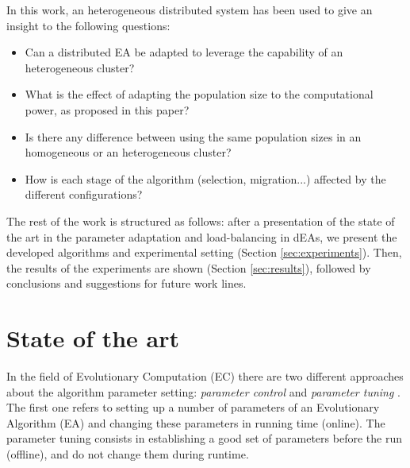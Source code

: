 \documentclass[final,1p,times]{elsarticle}
\begin{document}
In this work, an heterogeneous distributed system has been used to give an insight to the following questions:
\begin{itemize}
 \item Can a distributed EA be adapted to leverage the capability of an heterogeneous cluster?
 \item What is the effect of adapting the population size to the computational power, as proposed in this paper? %
 \item Is there any difference between using the same population sizes in an homogeneous or an heterogeneous cluster?
 \item How is each stage of the algorithm (selection, migration...) affected by the different
   configurations? %
\end{itemize}


The rest of the work is structured as follows: after a presentation of
the state of
the art in the parameter adaptation and load-balancing in dEAs, %
 we present the developed algorithms and experimental setting (Section \ref{sec:experiments}). 
Then, the results of the experiments are shown (Section \ref{sec:results}), followed by conclusions and suggestions for future work lines.


%
\section{State of the art}
\label{sec:soa}
%

In the field of  Evolutionary Computation (EC) there are two different approaches about the algorithm parameter setting: {\em parameter control} and {\em parameter tuning} \cite{PARAMETERTUNING}. The first one refers to setting up a number of parameters of an Evolutionary Algorithm (EA) and changing these parameters in running time (online). The parameter tuning consists in establishing a good set of parameters before the run (offline), and do not change them during runtime.
\end{document}
